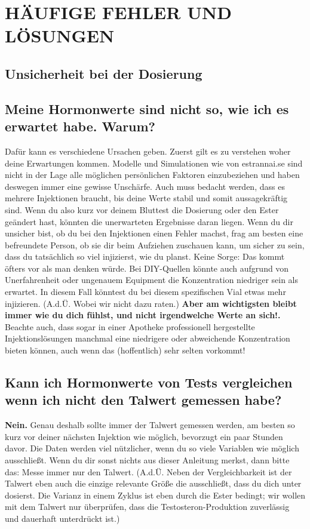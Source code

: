 \documentclass{article}
\begin{document}
\section{HÄUFIGE FEHLER UND LÖSUNGEN}

\subsection*{Unsicherheit bei der Dosierung}

\subsection{Meine Hormonwerte sind nicht so, wie ich es erwartet habe. Warum?}

Dafür kann es verschiedene Ursachen geben. Zuerst gilt es zu verstehen woher deine Erwartungen kommen. Modelle und Simulationen wie von estrannai.se sind nicht in der Lage alle möglichen persönlichen Faktoren einzubeziehen und haben deswegen immer eine gewisse Unschärfe. Auch muss bedacht werden, dass es mehrere Injektionen braucht, bis deine Werte stabil und somit aussagekräftig sind. Wenn du also kurz vor deinem Bluttest die Dosierung oder den Ester geändert hast, könnten die unerwarteten Ergebnisse daran liegen. Wenn du dir unsicher bist, ob du bei den Injektionen einen Fehler machst, frag am besten eine befreundete Person, ob sie dir beim Aufziehen zuschauen kann, um sicher zu sein, dass du tatsächlich so viel injizierst, wie du planst. Keine Sorge: Das kommt öfters vor als man denken würde. Bei DIY-Quellen könnte auch aufgrund von Unerfahrenheit oder ungenauem Equipment die Konzentration niedriger sein als erwartet. In diesem Fall könntest du bei diesem spezifischen Vial etwas mehr injizieren. (A.d.Ü. Wobei wir nicht dazu raten.) \textbf{Aber am wichtigsten bleibt immer wie du dich fühlst, und nicht irgendwelche Werte an sich!. }Beachte auch, dass sogar in einer Apotheke professionell hergestellte Injektionslösungen manchmal eine niedrigere oder abweichende Konzentration bieten können, auch wenn das (hoffentlich) sehr selten vorkommt!

\subsection{Kann ich Hormonwerte von Tests vergleichen wenn ich nicht den Talwert gemessen habe?}

\textbf{Nein. } Genau deshalb sollte immer der Talwert gemessen werden, am besten so kurz vor deiner nächsten Injektion wie möglich, bevorzugt ein paar Stunden davor. Die Daten werden viel nützlicher, wenn du so viele Variablen wie möglich ausschließt. Wenn du dir sonst nichts aus dieser Anleitung merkst, dann bitte das: Messe immer nur den Talwert. (A.d.Ü. Neben der Vergleichbarkeit ist der Talwert eben auch die einzige relevante Größe die ausschließt, dass du dich unter dosierst. Die Varianz in einem Zyklus ist eben durch die Ester bedingt; wir wollen mit dem Talwert nur überprüfen, dass die Testosteron-Produktion zuverlässig und dauerhaft unterdrückt ist.)
\end{document}

